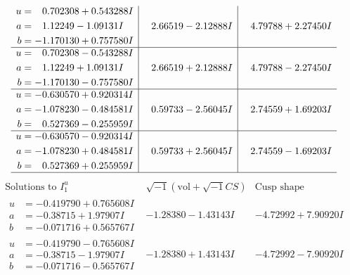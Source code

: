 \documentclass[1p]{elsarticle_modified}
\theoremstyle{definition}
\newcommand{\I}{\sqrt{-1}}
\begin{document}
$$\begin{array}{c|c|c}
\begin{aligned}
u &= \phantom{-}0.702308 + 0.543288 I \\
a &= \phantom{-}1.12249 - 1.09131 I \\
b &= -1.170130 + 0.757580 I\end{aligned}
 & \phantom{-}2.66519 - 2.12888 I & \phantom{-}4.79788 + 2.27450 I \\ \hline\begin{aligned}
u &= \phantom{-}0.702308 - 0.543288 I \\
a &= \phantom{-}1.12249 + 1.09131 I \\
b &= -1.170130 - 0.757580 I\end{aligned}
 & \phantom{-}2.66519 + 2.12888 I & \phantom{-}4.79788 - 2.27450 I \\ \hline\begin{aligned}
u &= -0.630570 + 0.920314 I \\
a &= -1.078230 - 0.484581 I \\
b &= \phantom{-}0.527369 - 0.255959 I\end{aligned}
 & \phantom{-}0.59733 - 2.56045 I & \phantom{-}2.74559 + 1.69203 I \\ \hline\begin{aligned}
u &= -0.630570 - 0.920314 I \\
a &= -1.078230 + 0.484581 I \\
b &= \phantom{-}0.527369 + 0.255959 I\end{aligned}
 & \phantom{-}0.59733 + 2.56045 I & \phantom{-}2.74559 - 1.69203 I\\
 \hline 
 \end{array}$$\newpage$$\begin{array}{c|c|c}  
\text{Solutions to }I^u_{1}& \I (\text{vol} + \sqrt{-1}CS) & \text{Cusp shape}\\
 \hline 
\begin{aligned}
u &= -0.419790 + 0.765608 I \\
a &= -0.38715 + 1.97907 I \\
b &= -0.071716 + 0.565767 I\end{aligned}
 & -1.28380 - 1.43143 I & -4.72992 + 7.90920 I \\ \hline\begin{aligned}
u &= -0.419790 - 0.765608 I \\
a &= -0.38715 - 1.97907 I \\
b &= -0.071716 - 0.565767 I\end{aligned}
 & -1.28380 + 1.43143 I & -4.72992 - 7.90920 I \\ \hline\begin{aligned}

\end{aligned}
\end{array}$$
\end{document}
